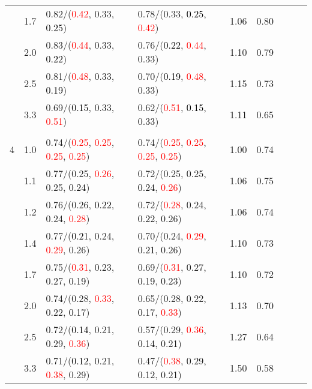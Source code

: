 \documentclass[10pt,a4paper]{report}
\begin{document}
\begin{table}[!htbp]
\begin{center}
{\begin{tabular}{ccllccccc}
			&1.7&0.82/(\textcolor{red}{0.42}, 0.33, \textcolor{black}{0.25})&0.78/(0.33, \textcolor{black}{0.25}, \textcolor{red}{0.42})&1.06&0.80\\
			&2.0&0.83/(\textcolor{red}{0.44}, 0.33, \textcolor{black}{0.22})&0.76/(\textcolor{black}{0.22}, \textcolor{red}{0.44}, 0.33)&1.10&0.79\\
			&2.5&0.81/(\textcolor{red}{0.48}, 0.33, \textcolor{black}{0.19})&0.70/(\textcolor{black}{0.19}, \textcolor{red}{0.48}, 0.33)&1.15&0.73\\
			&3.3&0.69/(\textcolor{black}{0.15}, 0.33, \textcolor{red}{0.51})&0.62/(\textcolor{red}{0.51}, \textcolor{black}{0.15}, 0.33)&1.11&0.65\\
			&&&&\\
			4			&1.0&0.74/(\textcolor{red}{0.25}, \textcolor{red}{0.25}, \textcolor{red}{0.25}, \textcolor{red}{0.25})&0.74/(\textcolor{red}{0.25}, \textcolor{red}{0.25}, \textcolor{red}{0.25}, \textcolor{red}{0.25})&1.00&0.74\\
			&1.1&0.77/(0.25, \textcolor{red}{0.26}, 0.25, \textcolor{black}{0.24})&0.72/(0.25, 0.25, \textcolor{black}{0.24}, \textcolor{red}{0.26})&1.06&0.75\\
			&1.2&0.76/(0.26, \textcolor{black}{0.22}, 0.24, \textcolor{red}{0.28})&0.72/(\textcolor{red}{0.28}, 0.24, \textcolor{black}{0.22}, 0.26)&1.06&0.74\\
			&1.4&0.77/(\textcolor{black}{0.21}, 0.24, \textcolor{red}{0.29}, 0.26)&0.70/(0.24, \textcolor{red}{0.29}, \textcolor{black}{0.21}, 0.26)&1.10&0.73\\
			&1.7&0.75/(\textcolor{red}{0.31}, 0.23, 0.27, \textcolor{black}{0.19})&0.69/(\textcolor{red}{0.31}, 0.27, \textcolor{black}{0.19}, 0.23)&1.10&0.72\\
			&2.0&0.74/(0.28, \textcolor{red}{0.33}, 0.22, \textcolor{black}{0.17})&0.65/(0.28, 0.22, \textcolor{black}{0.17}, \textcolor{red}{0.33})&1.13&0.70\\
			&2.5&0.72/(\textcolor{black}{0.14}, 0.21, 0.29, \textcolor{red}{0.36})&0.57/(0.29, \textcolor{red}{0.36}, \textcolor{black}{0.14}, 0.21)&1.27&0.64\\
			&3.3&0.71/(\textcolor{black}{0.12}, 0.21, \textcolor{red}{0.38}, 0.29)&0.47/(\textcolor{red}{0.38}, 0.29, \textcolor{black}{0.12}, 0.21)&1.50&0.58\\
			\bottomrule
		\end{tabular}}
	\end{center}
\end{table}
\end{document}
